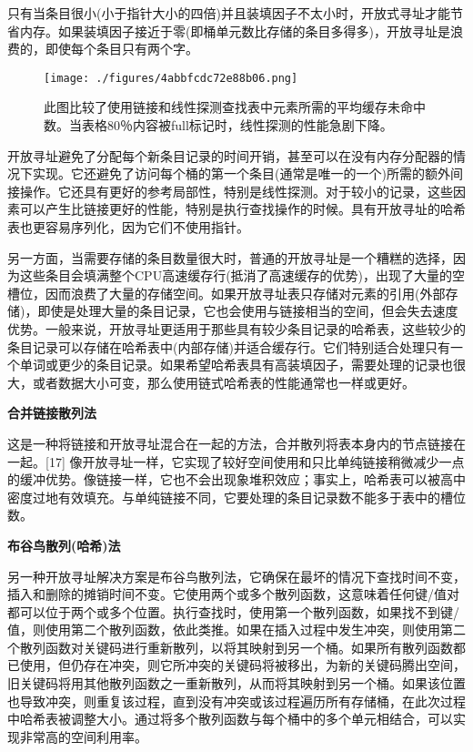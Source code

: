 只有当条目很小(小于指针大小的四倍)并且装填因子不太小时，开放式寻址才能节省内存。如果装填因子接近于零(即桶单元数比存储的条目多得多)，开放寻址是浪费的，即使每个条目只有两个字。
\begin{figure}[ht]
\centering
\texttt{[image: ./figures/4abbfcdc72e88b06.png]}
\caption{此图比较了使用链接和线性探测查找表中元素所需的平均缓存未命中数。当表格80％内容被full标记时，线性探测的性能急剧下降。} \label{fig_HXB_4}
\end{figure}
开放寻址避免了分配每个新条目记录的时间开销，甚至可以在没有内存分配器的情况下实现。它还避免了访问每个桶的第一个条目(通常是唯一的一个)所需的额外间接操作。它还具有更好的参考局部性，特别是线性探测。对于较小的记录，这些因素可以产生比链接更好的性能，特别是执行查找操作的时候。具有开放寻址的哈希表也更容易序列化，因为它们不使用指针。

另一方面，当需要存储的条目数量很大时，普通的开放寻址是一个糟糕的选择，因为这些条目会填满整个CPU高速缓存行(抵消了高速缓存的优势)，出现了大量的空槽位，因而浪费了大量的存储空间。如果开放寻址表只存储对元素的引用(外部存储)，即使是处理大量的条目记录，它也会使用与链接相当的空间，但会失去速度优势。一般来说，开放寻址更适用于那些具有较少条目记录的哈希表，这些较少的条目记录可以存储在哈希表中(内部存储)并适合缓存行。它们特别适合处理只有一个单词或更少的条目记录。如果希望哈希表具有高装填因子，需要处理的记录也很大，或者数据大小可变，那么使用链式哈希表的性能通常也一样或更好。

\textbf{合并链接散列法}

这是一种将链接和开放寻址混合在一起的方法，合并散列将表本身内的节点链接在一起。[17] 像开放寻址一样，它实现了较好空间使用和只比单纯链接稍微减少一点的缓冲优势。像链接一样，它也不会出现象堆积效应；事实上，哈希表可以被高中密度过地有效填充。与单纯链接不同，它要处理的条目记录数不能多于表中的槽位数。

\textbf{布谷鸟散列(哈希)法}

另一种开放寻址解决方案是布谷鸟散列法，它确保在最坏的情况下查找时间不变，插入和删除的摊销时间不变。它使用两个或多个散列函数，这意味着任何键/值对都可以位于两个或多个位置。执行查找时，使用第一个散列函数，如果找不到键/值，则使用第二个散列函数，依此类推。如果在插入过程中发生冲突，则使用第二个散列函数对关键码进行重新散列，以将其映射到另一个桶。如果所有散列函数都已使用，但仍存在冲突，则它所冲突的关键码将被移出，为新的关键码腾出空间，旧关键码将用其他散列函数之一重新散列，从而将其映射到另一个桶。如果该位置也导致冲突，则重复该过程，直到没有冲突或该过程遍历所有存储桶，在此次过程中哈希表被调整大小。通过将多个散列函数与每个桶中的多个单元相结合，可以实现非常高的空间利用率。

